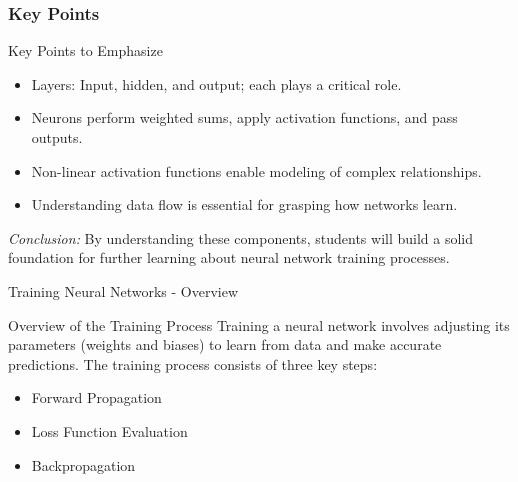 \documentclass[aspectratio=169]{beamer}
\begin{document}
\begin{frame}[fragile]
    \frametitle{Key Points}
    \begin{block}{Key Points to Emphasize}
        \begin{itemize}
            \item Layers: Input, hidden, and output; each plays a critical role.
            \item Neurons perform weighted sums, apply activation functions, and pass outputs.
            \item Non-linear activation functions enable modeling of complex relationships.
            \item Understanding data flow is essential for grasping how networks learn.
        \end{itemize}
    \end{block}
    \textit{Conclusion:} By understanding these components, students will build a solid foundation for further learning about neural network training processes.
\end{frame}

\begin{frame}[fragile]{Training Neural Networks - Overview}
    \begin{block}{Overview of the Training Process}
        Training a neural network involves adjusting its parameters (weights and biases) to learn from data and make accurate predictions. The training process consists of three key steps:
        \begin{itemize}
            \item Forward Propagation
            \item Loss Function Evaluation
            \item Backpropagation
        \end{itemize}
    \end{block}
\end{frame}
\end{document}
